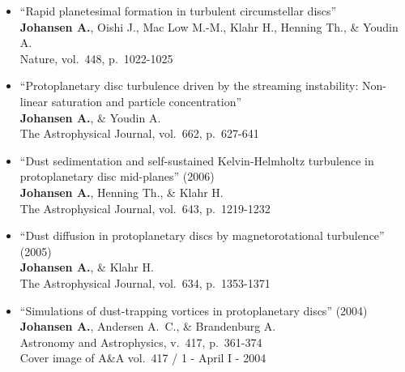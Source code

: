\documentclass{article}
\begin{document}
\begin{itemize}
  \item ``Rapid planetesimal formation in turbulent circumstellar discs''\\
    {\bf Johansen A.}, Oishi J., Mac Low M.-M., Klahr H., Henning Th., \&
    Youdin A.\\
    Nature, vol.\ 448, p.\ 1022-1025
  \item ``Protoplanetary disc turbulence driven by the streaming instability:
    Non-linear saturation and particle concentration''\\
    {\bf Johansen A.}, \& Youdin A.\\
    The Astrophysical Journal, vol.\ 662, p.\ 627-641
  \item ``Dust sedimentation and self-sustained Kelvin-Helmholtz turbulence in
    protoplanetary disc mid-planes'' (2006)\\
    {\bf Johansen A.}, Henning Th., \& Klahr H.\\
    The Astrophysical Journal, vol.\ 643, p.\ 1219-1232
  \item ``Dust diffusion in protoplanetary discs by magnetorotational
    turbulence'' (2005)\\
    {\bf Johansen A.}, \& Klahr H.\\
    The Astrophysical Journal, vol.\ 634, p.\ 1353-1371
  \item ``Simulations of dust-trapping vortices in protoplanetary discs''
    (2004)\\
    {\bf Johansen A.}, Andersen A.\ C., \& Brandenburg A.\\
    Astronomy and Astrophysics, v.\ 417, p.\ 361-374\\
    Cover image of A\&A vol.\ 417 / 1 - April I - 2004
\end{itemize}
\end{document}
